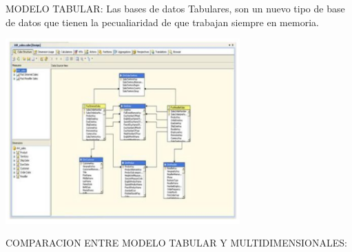 \documentclass[%
 reprint,
 amsmath,amssymb,
 aps,
]{revtex4-1}
\begin{document}
MODELO TABULAR:
Las bases de datos Tabulares, son un nuevo tipo de base de datos que tienen la pecualiaridad de que trabajan siempre en memoria.

\begin{center}
	\includegraphics[width=9cm]{./Imagenes/1b}
\end{center}

COMPARACION ENTRE MODELO TABULAR Y MULTIDIMENSIONALES:
\end{document}
